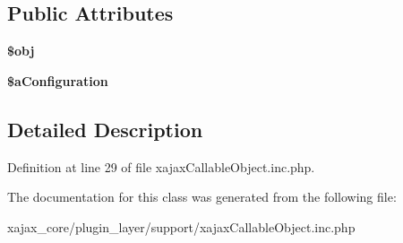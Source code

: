 \subsection*{Public Attributes}
\begin{DoxyCompactItemize}
\item 
\hypertarget{classxajaxCallableObject_ab0b05db4ecd7160977757a1850d6d00b}{
{\bfseries \$obj}}
\label{classxajaxCallableObject_ab0b05db4ecd7160977757a1850d6d00b}

\item 
\hypertarget{classxajaxCallableObject_acd2d538abc1e6a0e1f7d8ca59ecffd97}{
{\bfseries \$aConfiguration}}
\label{classxajaxCallableObject_acd2d538abc1e6a0e1f7d8ca59ecffd97}

\end{DoxyCompactItemize}


\subsection{Detailed Description}


Definition at line 29 of file xajaxCallableObject.inc.php.



The documentation for this class was generated from the following file:\begin{DoxyCompactItemize}
\item 
xajax\_\-core/plugin\_\-layer/support/xajaxCallableObject.inc.php\end{DoxyCompactItemize}
